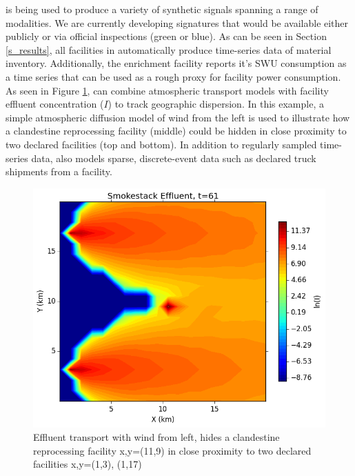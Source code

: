 \Cyclus is being used to produce a variety of synthetic signals spanning a range of modalities.  We are currently developing signatures that would be available either publicly or via official inspections (green or blue).  As can be seen in Section \ref{s_results}, all facilities in \Cyclus automatically produce time-series data of material inventory.  Additionally, the enrichment facility reports it's SWU consumption as a time series that can be used as a rough proxy for facility power consumption. As seen in Figure \ref{fig:effluent}, \Cyclus can combine atmospheric transport models with facility effluent concentration ($I$) to track geographic dispersion. In this example, a simple atmospheric diffusion model of wind from the left is used to illustrate how a clandestine reprocessing facility (middle) could be hidden in close proximity to two declared facilities (top and bottom)\cite{simple_transport_model}.  In addition to regularly sampled time-series data, \Cyclus also models sparse, discrete-event data such as declared truck shipments from a facility.


\begin{figure}%
\begin{center}
\includegraphics[natwidth=162bp,natheight=227bp, scale=0.4]{./figs/proper_diff_fr61.png}
\end{center}
\caption{Effluent transport with wind from left, hides a clandestine reprocessing facility x,y=(11,9) in close proximity to two declared facilities x,y=(1,3), (1,17)}
\label{fig:effluent}
\end{figure}

